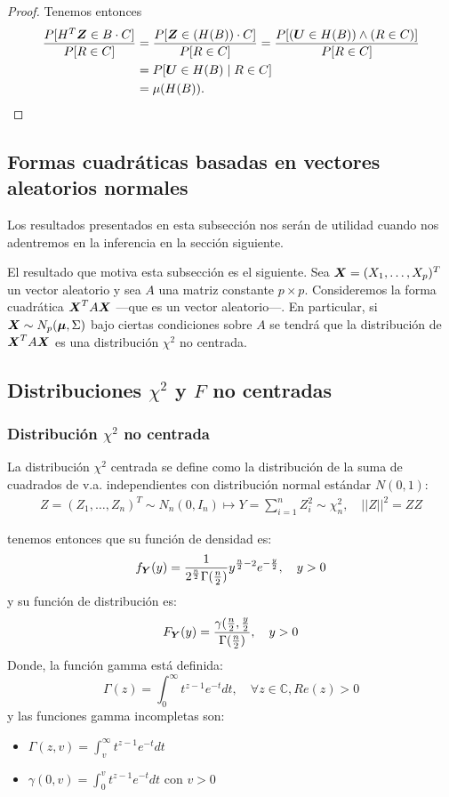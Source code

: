 \begin{proof}
  Tenemos entonces \begin{align*}
    \frac{P[H^T\boldsymbol{Z} \in B \cdot C]}{P[R \in C]} &= \frac{P[\boldsymbol{Z} \in (H(B)) \cdot C]}{P[R \in C]}
       = \frac{P[(\boldsymbol U \in H(B)) \land (R \in C)]}{P[R \in C]} \\
      &= P[\boldsymbol U \in H(B) \mid R \in C] \\
      &= \mu(H(B)).
  \end{align*}
\end{proof}

\subsection{Formas cuadráticas basadas en vectores aleatorios normales}

Los resultados presentados en esta subsección nos serán de utilidad cuando nos adentremos en la inferencia en la sección siguiente.

El resultado que motiva esta subsección es el siguiente. Sea $\boldsymbol{X} = (X_1, \dots, X_p)^T$ un vector aleatorio y sea $A$ una matriz constante $p \times p$. Consideremos la forma cuadrática $\boldsymbol{X}^T A \boldsymbol{X}$ —que es un vector aleatorio—. En particular, si $\boldsymbol{X} \sim N_p(\boldsymbol \mu, \Sigma)$ bajo ciertas condiciones sobre $A$ se tendrá que la distribución de $\boldsymbol{X}^TA\boldsymbol{X}$ es una distribución $\chi^2$ no centrada.


\subsection{Distribuciones $\chi^2$ y $F$ no centradas}
\subsubsection{Distribución $\chi^2$ no centrada}

\begin{ndef}
  La distribución $\chi^2$ centrada se define como la distribución de la suma de cuadrados de v.a. independientes con distribución normal estándar $N(0,1)$:
  \begin{align}
    Z = (Z_1, \dots, Z_n)^T \sim N_n(0,I_n)
    \mapsto Y = \sum_{i = 1}^n Z_i^2 \sim \chi^2_n, \quad ||Z||^2 = Z Z
\end{align}

  tenemos entonces que su función de densidad es:
  \[
f_{\boldsymbol{Y}}(y) = \frac{1}{2^{\frac{n}{2}} \Gamma(\frac{n}{2})} y^{\frac{n}{2} - 2} e^{-\frac{y}{2}}, \quad y > 0
\]
y su función de distribución es:
\[
F_{\boldsymbol{Y}}(y) = \frac{\gamma(\frac{n}{2}, \frac{y}{2}}{\Gamma(\frac{n}{2})}, \quad y > 0
\]
Donde, la función gamma está definida:
\[
\Gamma(z) = \int_0^\infty t^{z-1} e^{-t} dt, \quad \forall z \in \mathbb C, Re(z)>0
\]
y las funciones gamma incompletas son:
\begin{itemize}
\item $\Gamma(z,v) = \int_v ^\infty t^{z-1} e^{-t} dt$
  \item $\gamma(0,v) = \int_0^v t^{z-1} e^{-t} dt$ con $v>0$
\end{itemize} 
\end{ndef}

